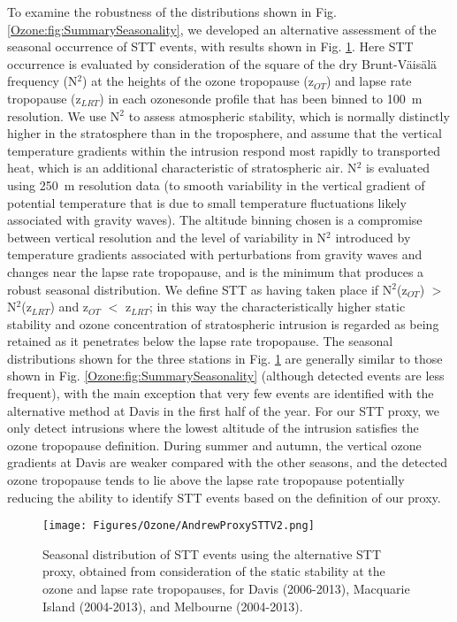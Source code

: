   To examine the robustness of the distributions shown in Fig. \ref{Ozone:fig:SummarySeasonality}, we developed an alternative assessment of the seasonal occurrence of STT events, with results shown in Fig. \ref{Ozone:fig:AndrewProxySTT}.
  Here STT occurrence is evaluated by consideration of the square of the dry Brunt-V\"{a}is\"{a}l\"{a} frequency (N$^2$) at the heights of the ozone tropopause (z$_{OT}$) and lapse rate tropopause (z$_{LRT}$) in each ozonesonde profile that has been binned to 100~m resolution.
  We use N$^2$ to assess atmospheric stability, which is normally distinctly higher in the stratosphere than in the troposphere, and assume that the vertical temperature gradients within the intrusion respond most rapidly to transported heat, which is an additional characteristic of stratospheric air.
  N$^2$ is evaluated using 250~m resolution data (to smooth variability in the vertical gradient of potential temperature that is due to small temperature fluctuations likely associated with gravity waves).
  The altitude binning chosen is a compromise between vertical resolution and the level of variability in N$^2$ introduced by temperature gradients associated with perturbations from gravity waves and changes near the lapse rate tropopause, and is the minimum that produces a robust seasonal distribution.
  We define STT as having taken place if N$^2$(z$_{OT}$) $>$ N$^2$(z$_{LRT}$) and z$_{OT}$ $<$ z$_{LRT}$; in this way the characteristically higher static stability and ozone concentration of stratospheric intrusion is regarded as being retained as it penetrates below the lapse rate tropopause. 
  The seasonal distributions shown for the three stations in Fig. \ref{Ozone:fig:AndrewProxySTT} are generally similar to those shown in Fig. \ref{Ozone:fig:SummarySeasonality} (although detected events are less frequent), with the main exception that very few events are identified with the alternative method at Davis in the first half of the year.
  For our STT proxy, we only detect intrusions where the lowest altitude of the intrusion satisfies the ozone tropopause definition. During summer and autumn, the vertical ozone gradients at Davis are weaker compared with the other seasons, and the detected ozone tropopause tends to lie above the lapse rate tropopause potentially reducing the ability to identify STT events based on the definition of our proxy.
  
  \begin{figure}[t]
    \texttt{[image: Figures/Ozone/AndrewProxySTTV2.png]}
    \caption{Seasonal distribution of STT events using the alternative STT proxy, obtained from consideration of the static stability at the ozone and lapse rate tropopauses, for Davis (2006-2013), Macquarie Island (2004-2013), and Melbourne (2004-2013).}
    \label{Ozone:fig:AndrewProxySTT}
  \end{figure}
  
